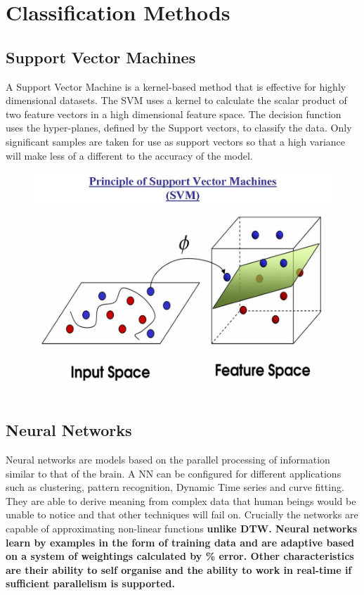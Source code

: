 \section{Classification Methods}

\subsection{Support Vector Machines}
A Support Vector Machine is a kernel-based method that is effective for highly dimensional datasets. The SVM uses a kernel to calculate the scalar product of two feature vectors in a high dimensional feature space. The decision function uses the hyper-planes, defined by the Support  vectors,  to  classify  the  data.  Only  significant  samples  are  taken  for  use  as support vectors so that a high variance will make less of a different to the accuracy of the model. \
\begin{figure}[h]
    \centering
    \includegraphics[height=0.25\textheight]{fig02/svm}
    \label{fig:kinect}
\end{figure}

\subsection{Neural Networks}
Neural networks are models based on the parallel processing of information similar to that of the brain. A NN can be configured for different applications such as clustering, pattern recognition, Dynamic Time series and curve fitting. They are able to derive meaning from complex data that human beings would be unable to notice and that other techniques will fail on. Crucially the networks are capable of approximating non-linear functions \textbf{unlike DTW. Neural networks learn by examples in the form of training data and are adaptive based on a system of weightings calculated by \% error. Other characteristics are their ability to self organise and the ability to work in real-time if sufficient parallelism is supported.}


